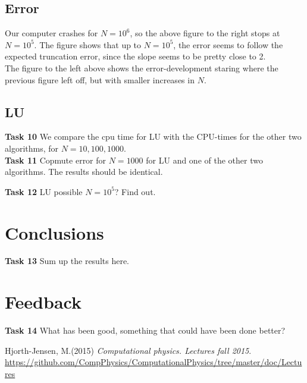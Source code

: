 \documentclass{article}
\begin{document}
\subsection{Error}





Our computer crashes for $N = 10^6$, so the above figure to the right stops at $N = 10^5$. The figure shows that up to $N = 10^5$, the error seems to follow the expected truncation error, since the slope seems to be pretty close to 2.\\

The figure to the left above shows the error-development staring where the previous figure left off, but with smaller increases in $N$.


\subsection{LU}
\textbf{Task 10} We compare the cpu time for LU with the CPU-times for the other two algorithms, for $N=10, 100, 1000$. \\

\textbf{Task 11} Copmute error for $N=1000$ for LU and one of the other two algorithms. The results should be identical.

\textbf{Task 12} LU possible $N=10^5$? Find out.

\section{Conclusions}
\textbf{Task 13} Sum up the results here.

\section{Feedback}
\textbf{Task 14} What has been good, something that could have been done better?

\begin{thebibliography}{9}
	Hjorth-Jensen, M.(2015)
	\textit{Computational physics. Lectures fall 2015}. 
	\url{https://github.com/CompPhysics/ComputationalPhysics/tree/master/doc/Lectures}
\end{thebibliography}
\end{document}
